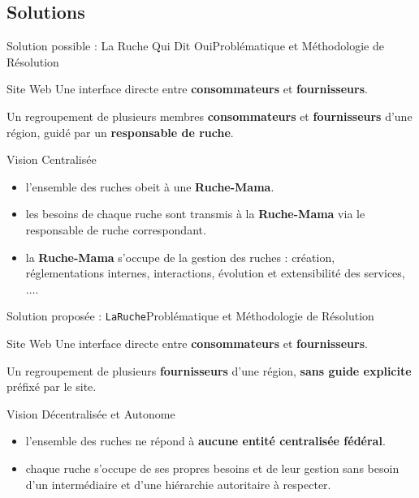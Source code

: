 \documentclass{beamer}
\begin{document}
\subsection{Solutions}
\begin{frame}{Solution possible : La Ruche Qui Dit Oui}{Problématique et Méthodologie de Résolution}
\begin{block}{Site Web}
Une interface directe entre \textbf{consommateurs} et \textbf{fournisseurs}.
\end{block}

\begin{definition}[Ruche]
Un regroupement de plusieurs membres \textbf{consommateurs} et \textbf{fournisseurs} d'une région, guidé par un \textbf{responsable de ruche}.
\end{definition}

\begin{block}{Vision Centralisée}
\begin{itemize}
  \item l'ensemble des ruches obeit à une \textbf{Ruche-Mama}.
  \item les besoins de chaque ruche sont transmis à la \textbf{Ruche-Mama} via le responsable de ruche correspondant.
  \item la \textbf{Ruche-Mama} s'occupe de la gestion des ruches : création, réglementations internes, interactions, évolution et extensibilité des services, $\dots$.
\end{itemize}
\end{block}
\end{frame}

\begin{frame}{Solution proposée : \texttt{LaRuche}}{Problématique et Méthodologie de Résolution}
\begin{block}{Site Web}
Une interface directe entre \textbf{consommateurs} et \textbf{fournisseurs}.
\end{block}

\begin{definition}[Ruche]
Un regroupement de plusieurs \textbf{fournisseurs} d'une région, \textbf{sans guide explicite} préfixé par le site.
\end{definition}

\begin{block}{Vision Décentralisée et Autonome}
\begin{itemize}
  \item l'ensemble des ruches ne répond à \textbf{aucune entité centralisée fédéral}.
  \item chaque ruche s'occupe de ses propres besoins et de leur gestion sans besoin d'un intermédiaire et d'une hiérarchie autoritaire à respecter.
\end{itemize}
\end{block}
\end{frame}
\end{document}
